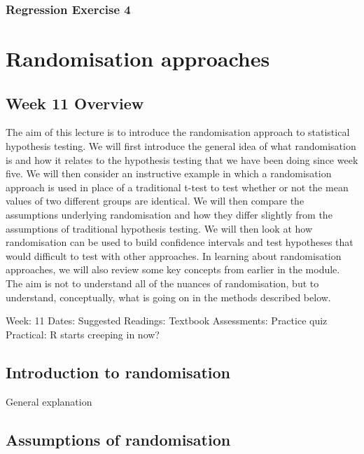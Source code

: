 \documentclass[
]{scrbook}
\begin{document}
\hypertarget{regression-exercise-4}{%
\section{Regression Exercise 4}\label{regression-exercise-4}}

\hypertarget{part-randomisation-approaches}{%
\part{Randomisation approaches}\label{part-randomisation-approaches}}

\hypertarget{Week11}{%
\chapter*{Week 11 Overview}\label{Week11}}

The aim of this lecture is to introduce the randomisation approach to statistical hypothesis testing. We will first introduce the general idea of what randomisation is and how it relates to the hypothesis testing that we have been doing since week five. We will then consider an instructive example in which a randomisation approach is used in place of a traditional t-test to test whether or not the mean values of two different groups are identical. We will then compare the assumptions underlying randomisation and how they differ slightly from the assumptions of traditional hypothesis testing. We will then look at how randomisation can be used to build confidence intervals and test hypotheses that would difficult to test with other approaches. In learning about randomisation approaches, we will also review some key concepts from earlier in the module. The aim is not to understand all of the nuances of randomisation, but to understand, conceptually, what is going on in the methods described below.

Week: 11
Dates:
Suggested Readings: Textbook
Assessments: Practice quiz
Practical: R starts creeping in now?

\hypertarget{introduction-to-randomisation}{%
\chapter{Introduction to randomisation}\label{introduction-to-randomisation}}

General explanation

\hypertarget{assumptions-of-randomisation}{%
\chapter{Assumptions of randomisation}\label{assumptions-of-randomisation}}
\end{document}
